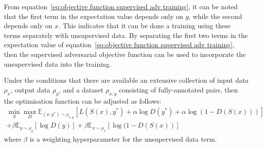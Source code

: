 \noindent From equation~\ref{eq:objective function supervised adv training}, it can be noted that the first term in the expectation value depends only on $y$, while the second depends only on $x$. This indicates that it can be done a training using these terms separately with unsupervised data. By separating the first two terms in the expectation value of equation~\ref{eq:objective function supervised adv training}, then the supervised adversarial objective function can be used to incorporate the unsupervised data into the training.

\noindent Under the conditions that there are available an extensive collection of input data $\rho_x$, output data $\rho_y$, and a dataset $\rho_{x,y}$ consisting of fully-annotated pairs, then the optimisation function can be adjusted as follows:
\begin{equation}\begin{split}
    \min_S \max_D \mathbb{E}_{(x,y^*)\sim \rho_{x,y}} [ L(S(x), y^*) + \alpha \log D(y^*) + \alpha \log ( 1 - D(S(x)))] \\
    + \beta \mathbb{E}_{y \sim \rho_y} [\log D(y)] + \beta \mathbb{E}_{x \sim \rho_x} [\log ( 1- D(S(x))]
\end{split}
\end{equation}
where $\beta$ is a weighting hyperparameter for the unsupervised data term.\\

